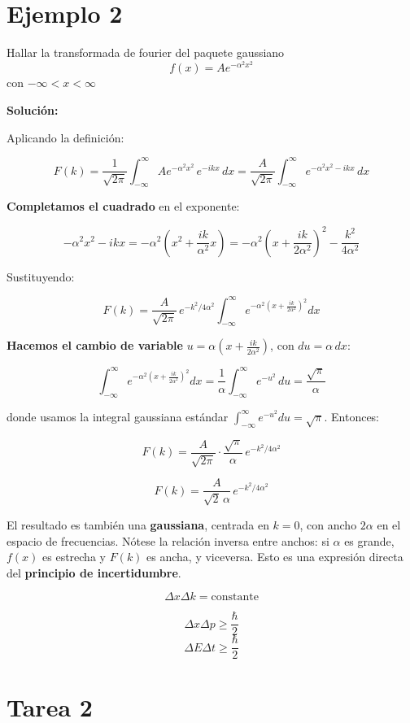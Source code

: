 \documentclass[a4paper]{article}
\begin{document}
\section{Ejemplo 2}

Hallar la transformada de fourier del paquete gaussiano $$f(x) = Ae^{-\alpha^2x^2}$$ con  $-\infty < x <\infty$

\textbf{Solución:}

Aplicando la definición:

$$F(k) = \frac{1}{\sqrt{2\pi}}\int_{-\infty}^{\infty} Ae^{-\alpha^2 x^2}\, e^{-ikx}\, dx = \frac{A}{\sqrt{2\pi}}\int_{-\infty}^{\infty} e^{-\alpha^2 x^2 - ikx}\, dx$$

\textbf{Completamos el cuadrado} en el exponente:

$$-\alpha^2 x^2 - ikx = -\alpha^2\left(x^2 + \frac{ik}{\alpha^2}x\right) = -\alpha^2\left(x + \frac{ik}{2\alpha^2}\right)^2 - \frac{k^2}{4\alpha^2}$$

Sustituyendo:

$$F(k) = \frac{A}{\sqrt{2\pi}}\, e^{-k^2/4\alpha^2} \int_{-\infty}^{\infty} e^{-\alpha^2\left(x + \frac{ik}{2\alpha^2}\right)^2} dx$$

\textbf{Hacemos el cambio de variable} $u = \alpha\left(x + \frac{ik}{2\alpha^2}\right)$, con $du = \alpha\, dx$:

$$\int_{-\infty}^{\infty} e^{-\alpha^2\left(x + \frac{ik}{2\alpha^2}\right)^2} dx = \frac{1}{\alpha}\int_{-\infty}^{\infty} e^{-u^2}\, du = \frac{\sqrt{\pi}}{\alpha}$$

donde usamos la integral gaussiana estándar $\int_{-\infty}^{\infty} e^{-u^2}du = \sqrt{\pi}$. Entonces:

$$F(k) = \frac{A}{\sqrt{2\pi}}\cdot\frac{\sqrt{\pi}}{\alpha}\, e^{-k^2/4\alpha^2}$$

$$\boxed{F(k) = \frac{A}{\sqrt{2}\,\alpha}\, e^{-k^2/4\alpha^2}}$$

El resultado es también una \textbf{gaussiana}, centrada en $k=0$, con ancho $2\alpha$ en el espacio de frecuencias. Nótese la relación inversa entre anchos: si $\alpha$ es grande, $f(x)$ es estrecha y $F(k)$ es ancha, y viceversa. Esto es una expresión directa del \textbf{principio de incertidumbre}.

$$\Delta x\Delta k = \text{constante}$$

$$\Delta x\Delta p \geq \frac{\hbar}{2}$$
$$\Delta E\Delta t \geq \frac{\hbar}{2}$$

\section{Tarea 2}
\end{document}
